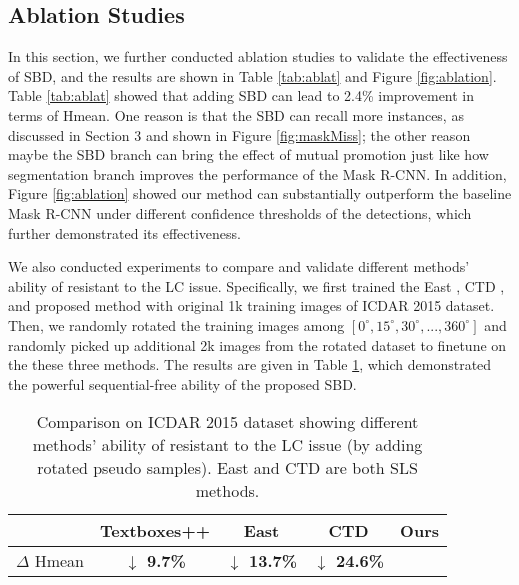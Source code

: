\documentclass{article}
\begin{document}
\subsection {Ablation Studies}
In this section, we further conducted ablation studies to validate the effectiveness of SBD, and the results are shown in Table \ref{tab:ablat} and Figure \ref{fig:ablation}. Table \ref{tab:ablat} showed that adding SBD can lead to 2.4\% improvement in terms of Hmean. One reason is that the SBD can recall more instances, as discussed in Section 3 and shown in Figure \ref{fig:maskMiss}; the other reason maybe the SBD branch can bring the effect of mutual promotion just like how segmentation branch improves the performance of the Mask R-CNN. In addition, Figure \ref{fig:ablation} showed our method can substantially outperform the baseline Mask R-CNN under different confidence thresholds of the detections, which further demonstrated its effectiveness.

We also conducted experiments to compare and validate different methods' ability of resistant to the LC issue. Specifically, we first trained the East \cite{zhou2017east}, CTD \cite{yuliang2017detecting}, and proposed method with original 1k training images of ICDAR 2015 dataset. Then, we randomly rotated the training images among $[0^\circ, 15^\circ, 30^\circ, ..., 360^\circ]$ and randomly picked up additional 2k images from the rotated dataset to finetune on the these three methods. The results are given in Table \ref{tab:sequence}, which demonstrated the powerful sequential-free ability of the proposed SBD.

\begin{table}[!t]
\centering
\small
\begin{tabular}{c|c|c|c|c}
  \hline
   & Textboxes++ & East  & CTD  & Ours \\
  \hline
  $\Delta$ Hmean & \bf \textcolor[RGB]{0,160,0}{$\downarrow$ 9.7\%} & \bf \textcolor[RGB]{0,160,0}{$\downarrow$ 13.7\%} & \bf \textcolor[RGB]{0,160,0}{$\downarrow$ 24.6\%} & \bf \color{red}{$\uparrow$ 0.3\%} \\
  \hline
\end{tabular}
\caption{Comparison on ICDAR 2015 dataset showing different methods' ability of resistant to the LC issue (by adding rotated pseudo samples). East and CTD are both SLS methods.}
\label{tab:sequence}
\end{table}
\end{document}
